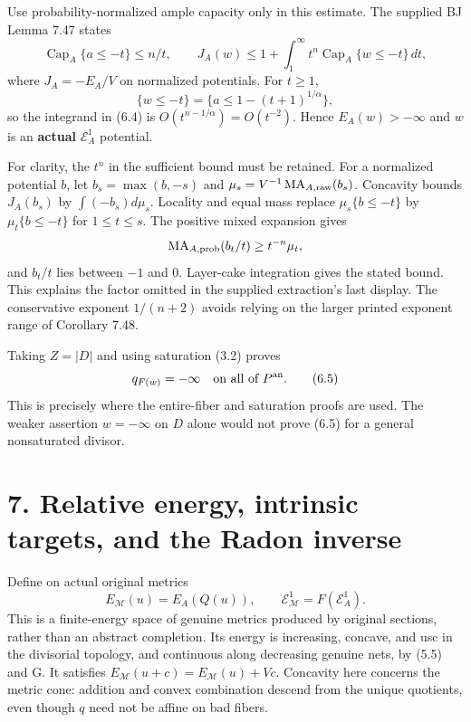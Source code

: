 \documentclass[
  10pt,
]{article}
\begin{document}
Use probability-normalized ample capacity only in this estimate. The
supplied BJ Lemma 7.47 states \[
 \operatorname{Cap}_A\{a\leq-t\}\leq n/t,\qquad
 J_A(w)\leq1+\int_1^\infty t^n\operatorname{Cap}_A\{w\leq-t\}\,dt,
 \tag{6.4}
\] where \(J_A=-E_A/V\) on normalized potentials. For \(t\geq1\), \[
 \{w\leq-t\}=\{a\leq1-(t+1)^{1/\alpha}\},
\] so the integrand in (6.4) is \(O(t^{n-1/\alpha})=O(t^{-2})\). Hence
\(E_A(w)>-\infty\) and \(w\) is an \textbf{actual} \(\mathcal E^1_A\)
potential.

For clarity, the \(t^n\) in the sufficient bound must be retained. For a
normalized potential \(b\), let \(b_s=\max(b,-s)\) and
\(\mu_s=V^{-1}\operatorname{MA}_{A,\rm raw}(b_s)\). Concavity bounds
\(J_A(b_s)\) by \(\int(-b_s)d\mu_s\). Locality and equal mass replace
\(\mu_s\{b\leq-t\}\) by \(\mu_t\{b\leq-t\}\) for \(1\leq t\leq s\). The
positive mixed expansion gives \[
 \operatorname{MA}_{A,\rm prob}(b_t/t)\geq t^{-n}\mu_t,
\] and \(b_t/t\) lies between \(-1\) and \(0\). Layer-cake integration
gives the stated bound. This explains the factor omitted in the supplied
extraction's last display. The conservative exponent \(1/(n+2)\) avoids
relying on the larger printed exponent range of Corollary 7.48.

Taking \(Z=|D|\) and using saturation (3.2) proves \[
 q_{F(w)}=-\infty\quad\hbox{on all of }P^{\rm an}.
 \tag{6.5}
\] This is precisely where the entire-fiber and saturation proofs are
used. The weaker assertion \(w=-\infty\) on \(D\) alone would not prove
(6.5) for a general nonsaturated divisor.

\section{7. Relative energy, intrinsic targets, and the Radon
inverse}\label{relative-energy-intrinsic-targets-and-the-radon-inverse}

Define on actual original metrics \[
 E_{\mathcal M}(u)=E_A(Q(u)),\qquad
 \mathcal E^1_{\mathcal M}=F(\mathcal E^1_A).
 \tag{7.1}
\] This is a finite-energy space of genuine metrics produced by original
sections, rather than an abstract completion. Its energy is increasing,
concave, and usc in the divisorial topology, and continuous along
decreasing genuine nets, by (5.5) and G. It satisfies
\(E_{\mathcal M}(u+c)=E_{\mathcal M}(u)+Vc\). Concavity here concerns
the metric cone: addition and convex combination descend from the unique
quotients, even though \(q\) need not be affine on bad fibers.
\end{document}
